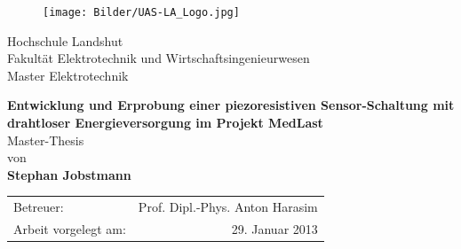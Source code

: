 \documentclass[12pt]{scrreprt} %
\begin{document}
\def\chapterpagestyle{fancy}
\begin{titlepage}
\thispagestyle{empty}
 \begin{center}
 \begin{figure}[htbp]
    \centering
    \texttt{[image: Bilder/UAS-LA\_Logo.jpg]}
\end{figure}
\vspace*{0.2cm}
 \Large{Hochschule Landshut\\Fakultät Elektrotechnik und Wirtschaftsingenieurwesen \\Master Elektrotechnik }

  \vspace*{1cm}
 {\bf \huge Entwicklung und Erprobung einer piezoresistiven Sensor-Schaltung mit drahtloser Energieversorgung im Projekt MedLast}
 \vspace*{1cm} \\
 {\Large Master-Thesis\\von\\}
 \vspace{0.5cm}
 {\Large \bfseries Stephan Jobstmann\\}
 \vspace*{2.2cm}
\centering
	\begin{tabular}{lr}
		Betreuer: &  Prof. Dipl.-Phys. Anton Harasim\\ 
		Arbeit vorgelegt am: & 29. Januar 2013\\ 
	\end{tabular}


 \end{center}
\end{titlepage}
\end{document}
